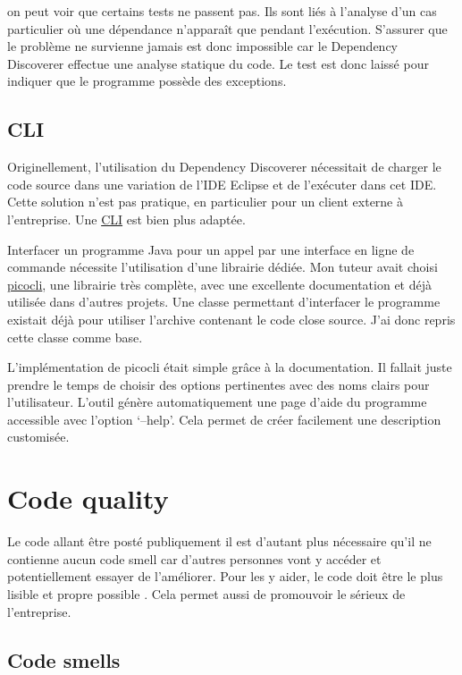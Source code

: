 \documentclass[french,a4paper,12pt]{report}
\begin{document}
on peut voir que certains tests ne passent pas. Ils sont liés à l'analyse d'un cas particulier où une dépendance n’apparaît que pendant l’exécution. S'assurer que le problème ne survienne jamais est donc impossible car le Dependency Discoverer effectue une analyse statique du code. Le test est donc laissé pour indiquer que le programme possède des exceptions.

\subsection{CLI}

Originellement, l'utilisation du Dependency Discoverer nécessitait de charger le code source dans une variation de l'IDE Eclipse et de l’exécuter dans cet IDE. Cette solution n'est pas pratique, en particulier pour un client externe à l'entreprise. Une \hyperlink{CLI}{CLI} est bien plus adaptée.

Interfacer un programme Java pour un appel par une interface en ligne de commande nécessite l’utilisation d’une librairie dédiée. Mon tuteur avait choisi \href{https://picocli.info/}{picocli}, une librairie très complète, avec une excellente documentation et déjà utilisée dans d'autres projets. Une classe permettant d’interfacer le programme existait déjà pour utiliser l’archive contenant le code close source. J’ai donc repris cette classe comme base. 

L’implémentation de picocli était simple grâce à la documentation. Il fallait juste prendre le temps de choisir des options pertinentes avec des noms clairs pour l’utilisateur. L’outil génère automatiquement une page d’aide du programme accessible avec l’option ‘--help’. Cela permet de créer facilement une description customisée.

\section{Code quality}

Le code allant être posté publiquement il est d’autant plus nécessaire qu’il ne contienne aucun code smell car d’autres personnes vont y accéder et potentiellement essayer de l’améliorer. Pour les y aider, le code doit être le plus lisible et propre possible . Cela permet aussi de promouvoir le sérieux de l’entreprise. 

\subsection{Code smells}
\end{document}
